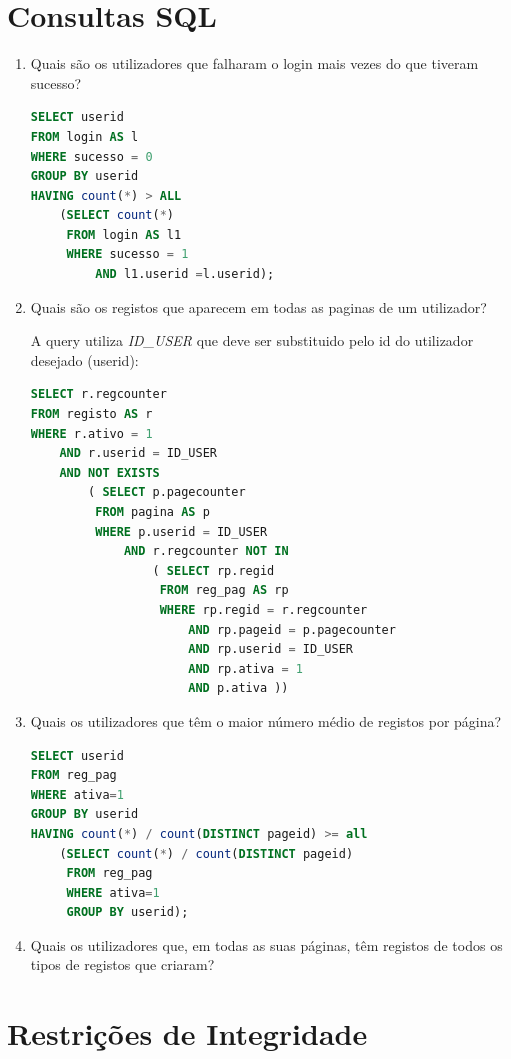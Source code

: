 \documentclass[11pt,a4paper]{article}
\begin{document}
\section{Consultas SQL}
\begin{enumerate}[label=(\alph*)]
	\item Quais são os utilizadores que falharam o login mais vezes do que tiveram sucesso?
		\begin{lstlisting}[language=SQL]
SELECT userid
FROM login AS l
WHERE sucesso = 0
GROUP BY userid
HAVING count(*) > ALL
    (SELECT count(*)
     FROM login AS l1
     WHERE sucesso = 1
         AND l1.userid =l.userid);
		\end{lstlisting}

	\item Quais são os registos que aparecem em todas as paginas de um utilizador?
	
	A query utiliza \textit{ID\_USER} que deve ser substituido pelo id do utilizador desejado (userid):
		\begin{lstlisting}[language=SQL]
SELECT r.regcounter
FROM registo AS r
WHERE r.ativo = 1
    AND r.userid = ID_USER
    AND NOT EXISTS
        ( SELECT p.pagecounter
         FROM pagina AS p
         WHERE p.userid = ID_USER
             AND r.regcounter NOT IN
                 ( SELECT rp.regid
                  FROM reg_pag AS rp
                  WHERE rp.regid = r.regcounter
                      AND rp.pageid = p.pagecounter
                      AND rp.userid = ID_USER
                      AND rp.ativa = 1
                      AND p.ativa ))
        		\end{lstlisting}
	\item Quais os utilizadores que têm o maior número médio de registos por página?
		\begin{lstlisting}[language=SQL]
SELECT userid
FROM reg_pag
WHERE ativa=1
GROUP BY userid
HAVING count(*) / count(DISTINCT pageid) >= all
    (SELECT count(*) / count(DISTINCT pageid)
     FROM reg_pag
     WHERE ativa=1
     GROUP BY userid);
		\end{lstlisting}
	
	\item Quais os utilizadores que, em todas as suas páginas, têm registos de todos os tipos de registos que criaram?
\end{enumerate}

\newpage

\section{Restrições de Integridade}
\newpage
\end{document}
